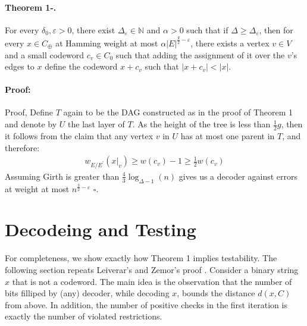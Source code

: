 \documentclass{article}
\begin{document}
\begin{multicols*}{2}
\paragraph{Theorem 1-.} For every $\delta_{0}, \varepsilon > 0$, there exist $\Delta_{\varepsilon}\in \mathbb{N}$ and $\alpha>0$ such that if $\Delta \ge \Delta_{\varepsilon}$, then for every $x \in C_{\oplus}$ at Hamming weight at most $\alpha |E|^{\frac{g}{2}-\varepsilon}$, there exists a vertex $v \in V$ and a small codeword $c_{v} \in C_{0} $ such that adding the assignment of it over the $v$'s edges to $x$ define the codeword $x + c_{v}$  such that $|x + c_{v}| < |x|$.  
\paragraph{Proof:} Proof,  Define $T$ again to be the DAG constructed as in the proof of Theorem 1 and denote by $U$ the last layer of $T$. As the height of the tree is less than $\frac{1}{2}g$, then it follows from the claim that any vertex $v$ in $U$ has at most one parent in $T$, and therefore:    
\begin{equation*}
  \begin{split}
    w_{E/E^{\prime}}\left( x|_{v} \right) \ge w(c_{v}) - 1 \ge \frac{1}{2}w(c_{v})
  \end{split}
\end{equation*}
Assuming Girth is greater than $\frac{4}{3}\log_{\Delta-1}\left( n \right)$  gives us a decoder against errors at weight at most $n^{\frac{3}{2}-\varepsilon}$ $\square$. 

\section{Decodeing and Testing}
For completeness, we show exactly how Theorem 1 implies testability. The following section repeats Leiverar's and Zemor's proof \cite{leverrier2022quantum}. Consider a binary string $x$ that is not a codeword. The main idea is the observation that the number of bits filliped by (any) decoder, while decoding $x$, bounds the distance $d\left( x,C \right)$ from above. In addition, the number of positive checks in the first iteration is exactly the number of violated restrictions.

\paragraph{}


\end{multicols*}
\end{document}

